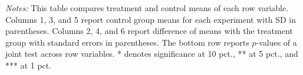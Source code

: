 \begin{table}[htbp]
{\begin{threeparttable}
\begin{tabular}{l*{6}{c}}
\bottomrule \end{tabular} \begin{tablenotes}[flushleft] \footnotesize \item \emph{Notes:} This table compares treatment and control means of each row variable. Columns 1, 3, and 5 report control group means for each experiment with SD in parentheses. Columns 2, 4, and 6 report difference of means with the treatment group with standard errors in parentheses. The bottom row reports \(p\)-values of a joint test across row variables.  * denotes significance at 10 pct., ** at 5 pct., and *** at 1 pct. \end{tablenotes} \end{threeparttable} } \end{table}
